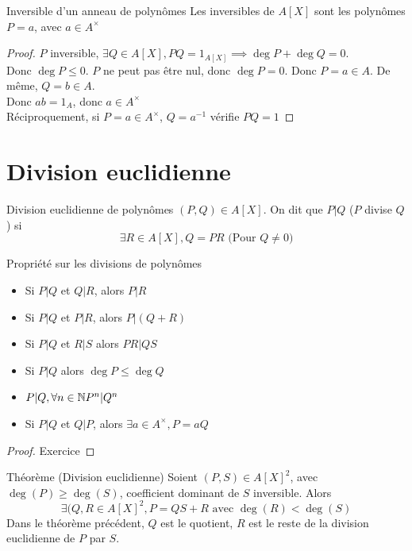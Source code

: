 \documentclass[]{report}
\begin{document}
    \begin{prop}{Inversible d'un anneau de polynômes}{}
        Les inversibles de $A[X]$ sont les polynômes $P=a$, avec $a\in A^\times$
    \end{prop}

    \begin{proof}
        $P$ inversible, $\exists Q\in A[X],PQ=1_{A[X]}\implies \deg P+\deg Q=0$.\\
        Donc $\deg P\le 0$. $P $ ne peut pas être nul, donc $\deg P=0$. Donc $P=a\in A$. De même, $Q=b\in A$.\\
        Donc $ab=1_{A}$, donc $a\in A^\times$\\
        Réciproquement, si $P=a\in A^{\times}$, $Q=a^{-1}$ vérifie $PQ=1$
    \end{proof}

    \section{Division euclidienne}

    \begin{df}{Division euclidienne de polynômes}{}
        $(P,Q)\in A[X]$. On dit que $P|Q$ ($P$ divise $Q$) si 
        \[\exists R\in A[X],Q=PR\text{ (Pour $Q\neq 0$)}\]
    \end{df}

    \begin{prop}{Propriété sur les divisions de polynômes}{}
        \begin{itemize}
            \item Si $P|Q$ et $Q|R$, alors $P|R$
            \item Si $P|Q$ et $P|R$, alors $P|(Q+R)$
            \item Si $P|Q$ et $R|S$ alors $PR|QS$
            \item Si $P|Q$ alors $\deg P \le \deg Q$
            \item $P|Q, \forall n\in\mathbb{N} P^n|Q^n$
            \item Si $P|Q$ et $Q|P$, alors $\exists a\in A^\times,P=aQ$
        \end{itemize}
    \end{prop}

    \begin{proof}
        Exercice
    \end{proof}

    \begin{tm}{Théorème (Division euclidienne)}{}
        Soient $(P,S)\in A[X]^2$, avec $\deg(P)\ge\deg(S)$, coefficient dominant de $S$ inversible. Alors 
        \[\exists(Q,R\in A[X]^2,P=QS+R\text{ avec $\deg(R)<\deg(S)$}\]
        Dans le théorème précédent, $Q$ est le quotient, $R$ est le reste de la division euclidienne de $P$ par $S$.
    \end{tm}
\end{document}
